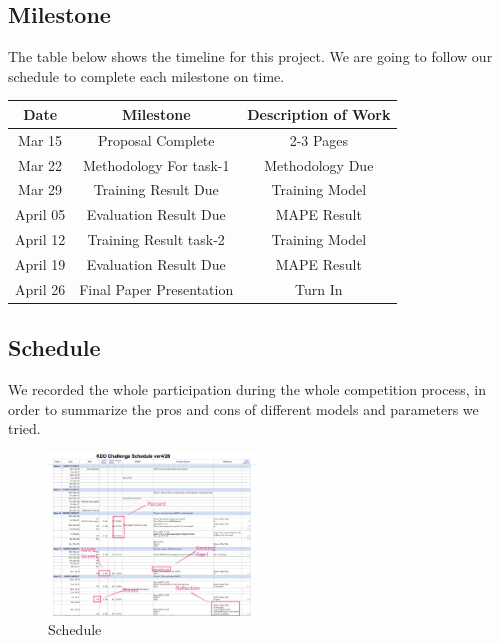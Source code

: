 \documentclass[journal, letterpaper]{IEEEtran}
\begin{document}
\subsection{Milestone}
The table below shows the timeline for this project. We are going to follow our schedule to complete each milestone on time.
\begin{table}[ht]
\centering %
\begin{tabular}{c| c| c} %
\hline\hline %
Date & Milestone & Description of Work  \\  %
\hline %
Mar 15 & Proposal Complete & 2-3 Pages  \\ %
\hline
Mar 22 & Methodology For task-1 & Methodology Due  \\
\hline
Mar 29 & Training Result Due & Training Model  \\
\hline
April 05 & Evaluation Result Due & MAPE Result  \\  %
\hline
April 12 & Training Result task-2 & Training Model \\
\hline
April 19 & Evaluation Result Due & MAPE Result \\
\hline
April 26 & Final Paper Presentation & Turn In \\
\hline %
\end{tabular}
\label{table:nonlin} %
\end{table}

\subsection{Schedule}
We recorded the whole participation during the whole competition process, in order to summarize the pros and cons of different models and parameters we tried.
\begin{figure} [H]
  \centering
  \includegraphics[width=0.49\textwidth]{kdd_schedule.png}
  \caption{Schedule}
  \label{fig:19}
\end{figure}
\end{document}

